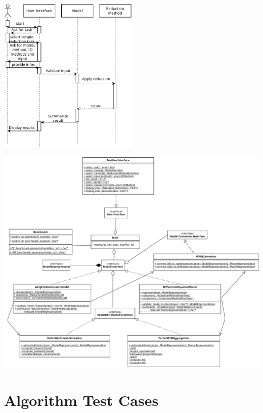             
            \begin{center}
                \includegraphics[keepaspectratio, width=0.5\textwidth]{img/sequence_simple.pdf}\\
            \end{center}
            \begin{center}
                \includegraphics[keepaspectratio, width=\textwidth]{img/class.pdf}
            \end{center}
            \restoregeometry
            \newpage
            
    
    \section{Algorithm Test Cases}
